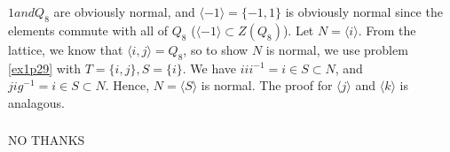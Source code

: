 \documentclass{article}
\newcommand{\set}[1]{ \{ #1 \} }
\newcommand{\inv}[1]{ {#1}^{-1} }
\newcommand{\cyclic}[1]{\langle#1\rangle}
\begin{document}
\subsubsection{}\label{ex1p32}
$1 and Q_8$ are obviously normal, and $\cyclic{-1} = \set{-1,1}$ is obviously normal since the elements commute with all of $Q_8$ ($\cyclic{-1} \subset Z(Q_8)$). Let $N = \cyclic{i}$. From the lattice, we know that $\cyclic{i,j}=Q_8$, so to show $N$ is normal, we use problem \ref{ex1p29} with $T=\set{i,j}, S=\set{i}$. We have $ii\inv{i} = i \in S \subset N$, and $ji\inv{g} =i \in S \subset N$. Hence, $N=\cyclic{S}$ is normal. The proof for $\cyclic{j}$ and $\cyclic{k}$ is analagous.
\subsubsection{}\label{ex1p33}
NO THANKS
\subsubsection{}\label{ex1p34}
\end{document}
